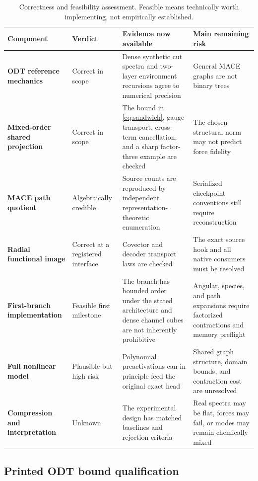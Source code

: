 \documentclass[10pt,twocolumn]{article}
\begin{document}
\begin{table}[t]
\centering
\small
\begin{tabularx}{0.98\textwidth}{>{\bfseries}p{} >{\centering\arraybackslash}p{} X X}
\toprule
Component & Verdict & Evidence now available & Main remaining risk \\
\midrule
ODT reference mechanics & Correct in scope & Dense synthetic cut spectra and two-layer environment recursions agree to numerical precision & General MACE graphs are not binary trees \\
Mixed-order shared projection & Correct in scope & The bound in \cref{eq:sandwich}, gauge transport, cross-term cancellation, and a sharp factor-three example are checked & The chosen structural norm may not predict force fidelity \\
MACE path quotient & Algebraically credible & Source counts are reproduced by independent representation-theoretic enumeration & Serialized checkpoint conventions still require reconstruction \\
Radial functional image & Correct at a registered interface & Covector and decoder transport laws are checked & The exact source hook and all native consumers must be resolved \\
First-branch implementation & Feasible first milestone & The branch has bounded order under the stated architecture and dense channel cubes are not inherently prohibitive & Angular, species, and path expansions require factorized contractions and memory preflight \\
Full nonlinear model & Plausible but high risk & Polynomial preactivations can in principle feed the original exact head & Shared graph structure, domain bounds, and contraction cost are unresolved \\
Compression and interpretation & Unknown & The experimental design has matched baselines and rejection criteria & Real spectra may be flat, forces may fail, or modes may remain chemically mixed \\
\bottomrule
\end{tabularx}
\caption{Correctness and feasibility assessment. Feasible means technically worth implementing, not empirically established.}
\label{tab:feasibility}
\end{table}

\subsection{Printed ODT bound qualification}
\end{document}
